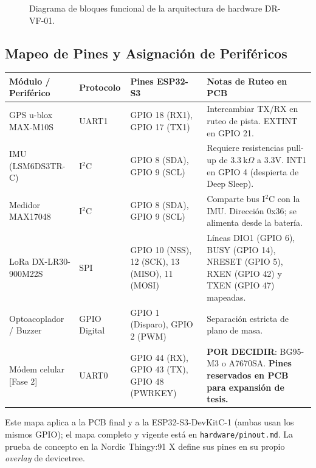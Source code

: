 \begin{figure}[H]
\caption{Diagrama de bloques funcional de la arquitectura de hardware DR-VF-01.}
\label{fig:bloques_hw}
\end{figure}

\subsection*{Mapeo de Pines y Asignación de Periféricos}

\begin{table}[H]
\centering
\small
\begin{tabularx}{\textwidth}{|l l l X|}
\hline
\rowcolor{categorybg}
\textbf{Módulo / Periférico} & \textbf{Protocolo} & \textbf{Pines ESP32-S3} & \textbf{Notas de Ruteo en PCB} \\ \hline
GPS u-blox MAX-M10S & UART1 & GPIO 18 (RX1), GPIO 17 (TX1) & Intercambiar TX/RX en ruteo de pista. EXTINT en GPIO 21. \\ \hline
IMU (LSM6DS3TR-C) & I$^2$C & GPIO 8 (SDA), GPIO 9 (SCL) & Requiere resistencias pull-up de $3.3~\text{k}\Omega$ a 3.3V. INT1 en GPIO 4 (despierta de Deep Sleep). \\ \hline
Medidor MAX17048 & I$^2$C & GPIO 8 (SDA), GPIO 9 (SCL) & Comparte bus I$^2$C con la IMU. Dirección 0x36; se alimenta desde la batería. \\ \hline
LoRa DX-LR30-900M22S & SPI & GPIO 10 (NSS), 12 (SCK), 13 (MISO), 11 (MOSI) & Líneas DIO1 (GPIO 6), BUSY (GPIO 14), NRESET (GPIO 5), RXEN (GPIO 42) y TXEN (GPIO 47) mapeadas. \\ \hline
Optoacoplador / Buzzer & GPIO Digital & GPIO 1 (Disparo), GPIO 2 (PWM) & Separación estricta de plano de masa. \\ \hline
\rowcolor{phase2orange}
Módem celular [Fase 2] & UART0 & GPIO 44 (RX), GPIO 43 (TX), GPIO 48 (PWRKEY) & \textbf{POR DECIDIR}: BG95-M3 o A7670SA. \textbf{Pines reservados en PCB para expansión de tesis.} \\ \hline
\end{tabularx}
\end{table}

Este mapa aplica a la PCB final y a la ESP32-S3-DevKitC-1 (ambas usan los mismos GPIO); el mapa completo y vigente está en \texttt{hardware/pinout.md}. La prueba de concepto en la Nordic Thingy:91 X define sus pines en su propio \emph{overlay} de devicetree.


